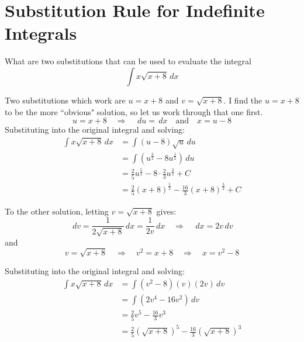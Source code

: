 \documentclass[handout, nooutcomes]{ximera}
\renewenvironment{freeResponse}{
\ifhandout\setbox0\vbox\bgroup\else
\begin{trivlist}\item[\hskip \labelsep\bfseries Solution:\hspace{2ex}]
\fi}
{\ifhandout\egroup\else
\end{trivlist}
\fi}
\renewcommand{\d}{\,d}
\begin{document}
\section{Substitution Rule for Indefinite Integrals}
\begin{problem}
  What are two substitutions that can be used to evaluate the integral \begin{equation*} \int x \sqrt{x+8} \d x \end{equation*}
	\begin{freeResponse}
    Two substitutions which work are $u=x+8$ and $v=\sqrt{x+8}$.
    I find the $u=x+8$ to be the more ``obvious" solution, so	let us work through that one first.
    \begin{equation*}
      u=x+8 \quad \Longrightarrow \quad \d u = \d x \quad \text{and} \quad x = u-8
		\end{equation*}
    Substituting into the original integral and solving:
		\begin{align*}
      \int x \sqrt{x+8} \d x
      &= \int (u-8) \sqrt{u} \d u  \\
      &= \int (u^{\frac{3}{2}} - 8u^{\frac{1}{2}} ) \d u  \\
      &= \frac{2}{5} u^{\frac{5}{2}} - 8 \cdot \frac{2}{3} u^{\frac{3}{2}} + C  \\
      &= \frac{2}{5}(x+8)^{\frac{5}{2}} - \frac{16}{3} (x+8)^{\frac{3}{2}} + C
    \end{align*}

    To the other solution, letting $v=\sqrt{x+8}$ gives:
    \begin{equation*}
      \d v = \frac{1}{2 \sqrt{x+8}} \d x = \frac{1}{2v} \d x 	\quad	\Longrightarrow \quad \d x = 2v \d v
    \end{equation*}
    and
    \begin{equation*}
       v = \sqrt{x+8} \quad \Longrightarrow \quad v^2 = x+8 \quad \Longrightarrow \quad x= v^2-8
    \end{equation*}

     Substituting into the original integral and solving:
    \begin{align*}
       \int x \sqrt{x+8} \d x
       &= \int (v^2-8)(v)(2v)\d v  \\
       &= \int (2v^4 - 16v^2) \d v  \\
       &= \frac{2}{5} v^5 - \frac{16}{3} v^3  \\
       &= \frac{2}{5}(\sqrt{x+8})^5 - \frac{16}{3} (\sqrt{x+8})^3
    \end{align*}
  \end{freeResponse}
\end{problem}
\end{document}
